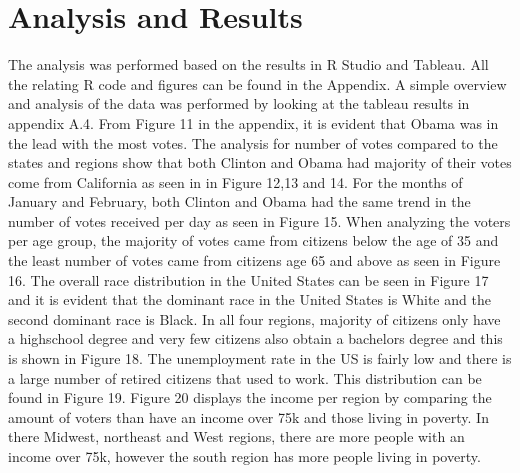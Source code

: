\documentclass[11pt]{article}
\begin{document}
\section{Analysis and Results}
The analysis was performed based on the results in R Studio and Tableau. All the relating R code and figures can be found in the Appendix. A simple overview and analysis of the data was performed by looking at the tableau results in appendix A.4. From Figure 11 in the appendix, it is evident that Obama was in the lead with the most votes. The analysis for number of votes compared to the states and regions show that both Clinton and Obama had majority of their votes come from California as seen in in Figure 12,13 and 14. For the months of January and February, both Clinton and Obama had the same trend in the number of votes received per day as seen in  Figure 15. When analyzing the voters per age group, the majority of votes came from citizens below the age of 35 and the least number of votes came from citizens age 65 and above as seen in Figure 16. The overall race distribution in the United States can be seen in Figure 17 and it is evident that the dominant race in the United States is White and the second dominant race is Black. In all four regions, majority of citizens only have a highschool degree and very few citizens also obtain a bachelors degree and this is shown in Figure 18. The unemployment rate in the US is fairly  low and there is a large number of retired citizens that used to work. This distribution can be found in Figure 19. Figure 20 displays the income per region by comparing the amount of voters than have an income over 75k and those living in poverty. In there Midwest, northeast and West regions, there are more people with an income over 75k, however the south region has more people living in poverty. \\
\end{document}
